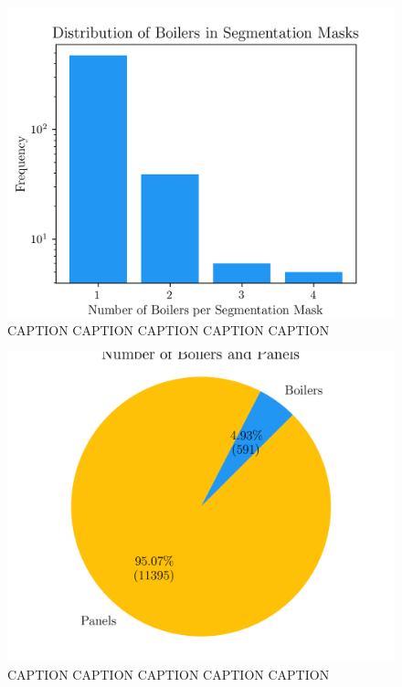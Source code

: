 \documentclass[conference]{IEEEtran}
\begin{document}
\begin{figure}[H]
    \centering
    \includegraphics[width=1\linewidth]{assets/data_boil_distribution.png}
    \caption{CAPTION CAPTION CAPTION CAPTION CAPTION}
    \label{fig:data_boil_distribution}
\end{figure}

\begin{figure}[H]
    \centering
    \includegraphics[width=1\linewidth]{assets/data_distribution.png}
    \caption{CAPTION CAPTION CAPTION CAPTION CAPTION}
    \label{fig:data_distribution}
\end{figure}
\end{document}
